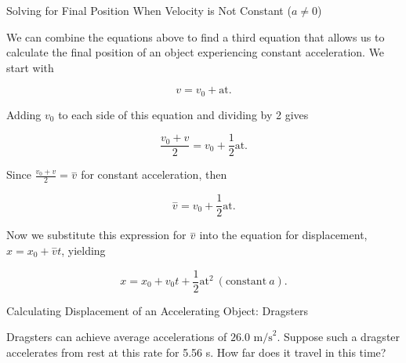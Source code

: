 \documentclass[
]{book}
\newenvironment{note}{}{}
\begin{document}
\hypertarget{fs-id1164906444525}{}
\begin{note}

Solving for Final Position When Velocity is Not Constant (\(a \neq 0\))

We can combine the equations above to find a third equation that allows
us to calculate the final position of an object experiencing constant
acceleration. We start with

\leavevmode\hypertarget{import-auto-id2166975}{}%
\[{v = {v_{0} + \text{at}}.}{}\]

Adding \(v_{0}{}\) to each side of this equation and dividing by 2 gives

\leavevmode\hypertarget{import-auto-id1689620}{}%
\[{{\frac{v_{0} + v}{2} = {v_{0} + \frac{1}{2}}}\text{at}\text{.}}{}\]

Since \({\frac{v_{0} + v}{2} = \overset{-}{v}}{}\) for constant
acceleration, then

\leavevmode\hypertarget{import-auto-id2301379}{}%
\[{{\overset{-}{v} = {v_{0} + \frac{1}{2}}}\text{at}\text{.}}{}\]

Now we substitute this expression for \(\overset{-}{v}{}\) into the
equation for displacement, \({{x = {x_{0} + \overset{-}{v}}}t}{}\),
yielding

\leavevmode\hypertarget{import-auto-id1807031}{}%
\[{{x = {x_{0} + v_{0}}}{t + \frac{1}{2}}\text{at}^{2}\ (\text{constant}\ a)\text{.}}{}\]

\end{note}

\hypertarget{fs-id1164906457202}{}
Calculating Displacement of an Accelerating Object: Dragsters

Dragsters can achieve average accelerations of
\({\text{26}\text{.}\text{0\ m/s}^{2}}{}\). Suppose such a dragster
accelerates from rest at this rate for 5.56 s. How far does it travel in
this time?
\end{document}
